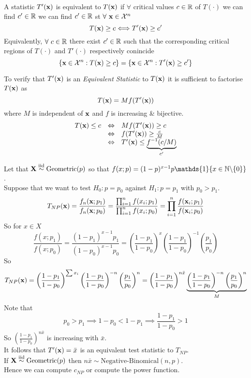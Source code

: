\documentclass[11pt,a4paper]{article}
\begin{document}
A statistic $T'(\textbf{x})$ is equivalent to $T(\textbf{x})$ if $\forall$ critical values $c\in\mathbb{R}$ of $T(\cdot)$ we can find $c'\in\mathbb{R}$ we can find $c'\in\mathbb{R}$ st $\forall\ \textbf{x}\in\mathcal{X}^n$
$$T(\textbf{x})\geq c\Longleftrightarrow T'(\textbf{x})\geq c'$$
Equivalently, $\forall\ c\in\reals$ there exist $c'\in\mathbb{R}$ such that the corresponding critical regions of $T(\cdot)$ and $T'(\cdot)$ respectively conincide
$$\{\textbf{x}\in\mathcal{X}^n:T(\textbf{x})\geq c\}=\{\textbf{x}\in\mathcal{X}^n:T'(\textbf{x})\geq c'\}$$

To verify that $T'(\textbf{x})$ is an \textit{Equivalent Statistic} to $T(\textbf{x})$ it is sufficient to factorise $T(\textbf{x})$ as
$$T(\textbf{x})=Mf(T'(\textbf{x}))$$
where $M$ is independent of $\textbf{x}$ and $f$ is increasing \& bijective.\\

\[\begin{array}{rcl}
T(\textbf{x})\leq c&\Leftrightarrow&Mf(T'(\textbf{x}))\geq c\\
&\Leftrightarrow&f(T'(\textbf{x}))\geq\frac{c}{M}\\
&\Leftrightarrow&T'(\textbf{x})\leq\underbrace{f^{-1}(c/M)}_{c'}
\end{array}\]

Let that $\textbf{X}\overset{\text{iid}}{\sim}\text{Geometric}(p)$ so that $f(x;p)=(1-p)^{x-1}p\mathds{1}\{x\in\nats\backslash\{0\}\}$.\\
Suppose that we want to test $H_0:p=p_0$ against $H_1:p=p_1$ with $p_0>p_1$.
$$T_{NP}(\textbf{x})=\frac{f_n(\textbf{x};p_1)}{f_n(\textbf{x};p_0)}=\frac{\prod_{i=1}^nf(x_i;p_1)}{\prod_{i=1}^nf(x_i;p_0)}=\prod_{i=1}^n\frac{f(\textbf{x}_i;p_1)}{f(\textbf{x}_i;p_0)}$$
So for $x\in X$
$$\frac{f(x;p_1)}{f(x;p_0)}=\frac{(1-p_1)^{x-1}p_1}{(1-p_0)^{x-1}p_0}=\left(\frac{1-p_1}{1-p_0}\right)^x\left(\frac{1-p_1}{1-p_0}\right)^{-1}\left(\frac{p_1}{p_0}\right)$$
So $$T_{NP}(\textbf{x})=\left(\frac{1-p_1}{1-p_0}\right)^{\sum x_i}\left(\frac{1-p_1}{1-p_0}\right)^{-n}\left(\frac{p_1}{p_0}\right)^n=\left(\frac{1-p_1}{1-p_0}\right)^{n\bar{x}}\underbrace{\left(\frac{1-p_1}{1-p_0}\right)^{-n}\left(\frac{p_1}{p_0}\right)^n}_{M}$$
Note that
$$p_0>p_1\implies 1-p_0<1-p_1\implies\frac{1-p_1}{1-p_0}>1$$
So $\left(\frac{1-p_1}{1-p_0}\right)^{n\bar{x}}$ is increasing with $\bar{x}$.\\
It follows that $T'(\textbf{x})=\bar{x}$ is an equivalent test statistic to $T_{NP}$.\\
If $\textbf{X}\overset{\text{iid}}{\sim}\text{Geometric}(p)$ then $n\bar{x}\sim\text{Negative-Binomical}(n,p)$.\\
Hence we can compute $c_{NP}$ or compute the power function.\\
\end{document}
